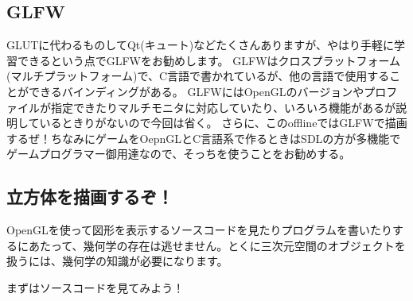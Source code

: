 \documentclass[a4paper,titlepage,dvipdfmx]{jsarticle}
\begin{document}
\subsection{GLFW}
GLUTに代わるものしてQt(キュート)などたくさんありますが、やはり手軽に学習できるという点でGLFWをお勧めします。
GLFWはクロスプラットフォーム(マルチプラットフォーム)で、C言語で書かれているが、他の言語で使用することができるバインディングがある。
GLFWにはOpenGLのバージョンやプロファイルが指定できたりマルチモニタに対応していたり、いろいろ機能があるが説明しているときりがないので今回は省く。
さらに、このofflineではGLFWで描画するぜ！ちなみにゲームをOepnGLとC言語系で作るときはSDLの方が多機能でゲームプログラマー御用達なので、そっちを使うことをお勧めする。\newpage

\subsection{立方体を描画するぞ！}
OpenGLを使って図形を表示するソースコードを見たりプログラムを書いたりするにあたって、幾何学の存在は逃せません。とくに三次元空間のオブジェクトを扱うには、幾何学の知識が必要になります。

まずはソースコードを見てみよう！
\end{document}
